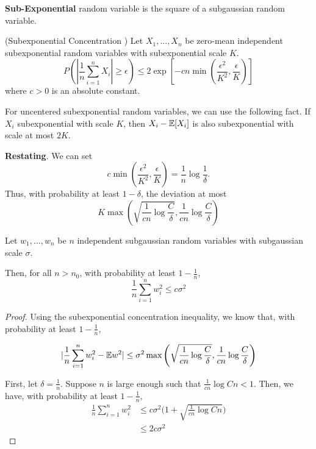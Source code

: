 \textbf{Sub-Exponential} random variable is the square of a subgaussian random variable\cite{vershynin2010introduction}.

\begin{proposition} (Subexponential Concentration \cite{vershynin2010introduction})
Let $X_1,...,X_n$ be zero-mean independent subexponential random variables with subexponential scale $K$. 
\[
P( | \frac{1}{n} \sum_{i=1}^n X_i | \geq \epsilon) \leq
	2 \exp \left[ -c n \min\left( \frac{\epsilon^2}{K^2}, \frac{\epsilon}{K} \right) \right]
\]
where $c > 0$ is an absolute constant.
\end{proposition}

For uncentered subexponential random variables, we can use the following fact. If $X_i$ subexponential with scale $K$, then $X_i - {\mathbb E}[X_i]$ is also subexponential with scale at most $2K$.

\textbf{Restating}. We can set
\[
c \min\left( \frac{\epsilon^2}{K^2}, \frac{\epsilon}{K} \right) = \frac{1}{n} \log \frac{1}{\delta}.
\]
Thus, with probability at least $1-\delta$, the deviation at most
\[
K \max\left( \sqrt{\frac{1}{cn} \log \frac{C}{\delta}},  \frac{1}{cn} \log \frac{C}{\delta} \right)
\]


\begin{corollary}
Let $w_1,...,w_n$ be $n$ independent subgaussian random variables with subgaussian scale $\sigma$. 

Then, for all $n > n_0$, with probability at least $1- \frac{1}{n}$,
\[
\frac{1}{n} \sum_{i=1}^n w_i^2 \leq c \sigma^2 
\]
\end{corollary}

\begin{proof}
Using the subexponential concentration inequality, we know that, with probability at least $1-\frac{1}{n}$, 

\[
| \frac{1}{n} \sum_{i=1}^n w_i^2 - {\mathbb E} w^2 | \leq \sigma^2 \max\left( \sqrt{\frac{1}{cn} \log \frac{C}{\delta}}, \frac{1}{cn}\log \frac{C}{\delta} \right)
\]

First, let $\delta = \frac{1}{n}$. Suppose $n$ is large enough such that $ \frac{1}{cn} \log Cn < 1$. Then, we have, with probability at least $1-\frac{1}{n}$,
\begin{align*}
 \frac{1}{n} \sum_{i=1}^n w_i^2 &\leq c\sigma^2 \Big(1+\sqrt{\frac{1}{cn} \log Cn}\Big) \\
		&\leq 2 c \sigma^2
 \end{align*}
 
\end{proof}

